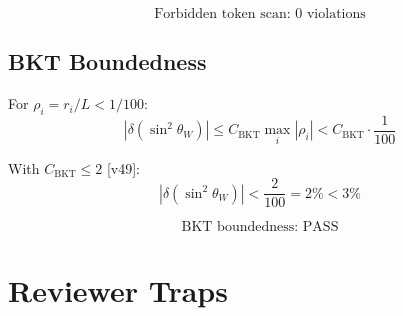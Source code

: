 \documentclass[11pt,a4paper]{article}
\theoremstyle{definition}
\begin{document}
\begin{equation}
\label{eq:forbidden_check}
\text{Forbidden token scan: } 0 \text{ violations}
\end{equation}

\subsection{BKT Boundedness}
\label{subsec:bkt_bound}

For $\rho_i = r_i/L < 1/100$:
\begin{equation}
\label{eq:bkt_bound}
|\delta(\sin^2\theta_W)| \leq C_{\text{BKT}} \max_i |\rho_i| < C_{\text{BKT}} \cdot \frac{1}{100}
\end{equation}

With $C_{\text{BKT}} \leq 2$ [v49]:
\begin{equation}
\label{eq:bkt_percent}
|\delta(\sin^2\theta_W)| < \frac{2}{100} = 2\% < 3\%
\end{equation}

\begin{equation}
\label{eq:bkt_check}
\text{BKT boundedness: PASS}
\end{equation}

\section{Reviewer Traps}
\label{sec:traps}
\end{document}
